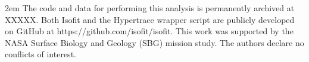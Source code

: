 \documentclass[draft]{agujournal2019}
\begin{document}
%
%
%
%
%
%
%
%


\acknowledgments
\emergencystretch 2em
The code and data for performing this analysis is permanently archived at XXXXX. %
Both Isofit and the Hypertrace wrapper script are publicly developed on GitHub at https://github.com/isofit/isofit.
This work was supported by the NASA Surface Biology and Geology (SBG) mission study.
The authors declare no conflicts of interest.

\fussy


%
%





%
%
%
%
%
\end{document}
